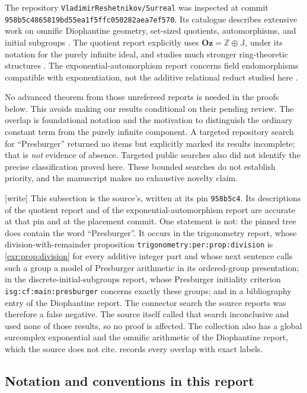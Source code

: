 \documentclass[11pt,letterpaper]{article}
\numberwithin{equation}{section}
\theoremstyle{definition}
\theoremstyle{remark}
\newcommand{\Oz}{\mathbf{Oz}}
\newcommand{\Z}{\mathbb Z}
\newcommand{\J}{\mathbb J}
\newcommand{\repoSHA}{\nolinkurl{958b5c4865819bd55ea1f5ffc050282aea7ef570}}
\newcommand{\lbl}[1]{\nolinkurl{#1}}%
\newcommand{\wtag}{\textup{[write]}}%
\begin{document}
The repository \texttt{VladimirReshetnikov/Surreal} was inspected at commit
\repoSHA. Its catalogue describes extensive work on omnific Diophantine geometry,
set-sized quotients, automorphisms, and initial subgroups \cite{repo-catalogue}.
The quotient report explicitly uses $\Oz=\Z\oplus\J$, under its notation for the
purely infinite ideal, and studies much stronger ring-theoretic structures
\cite{repo-quotients}. The exponential-automorphism report concerns field
endomorphisms compatible with exponentiation, not the additive relational reduct
studied here \cite{repo-exp}.

No advanced theorem from those unrefereed reports is needed in the proofs below.
This avoids making our results conditional on their pending review. The overlap
is foundational notation and the motivation to distinguish the ordinary constant
term from the purely infinite component. A targeted repository search for
``Presburger'' returned no items but explicitly marked its results incomplete;
that is \emph{not} evidence of absence. Targeted public searches also did not
identify the precise classification proved here. These bounded searches do not
establish priority, and the manuscript makes no exhaustive novelty claim.

\wtag{} This subsection is the source's, written at its pin
\nolinkurl{958b5c4}. Its descriptions of the quotient report and of the
exponential-automorphism report are accurate at that pin and at the placement
commit. One statement is not: the pinned tree does contain the word
``Presburger''. It occurs in the trigonometry report, whose
division-with-remainder proposition \lbl{trigonometry:per:prop:division} is
\cref{exr:prop:division} for every additive integer part and whose next
sentence calls such a group a model of Presburger arithmetic in its
ordered-group presentation; in the discrete-initial-subgroups report, whose
Presburger initiality criterion \lbl{isg:cf:main:presburger} concerns exactly
these groups; and in a bibliography entry of the Diophantine report. The
connector search the source reports was therefore a false negative. The
source itself called that search inconclusive and used none of those results,
so no proof is affected. The collection also has a global surcomplex
exponential and the omnific arithmetic of the Diophantine report, which the
source does not cite.  records every overlap with
exact labels.

\subsection{Notation and conventions in this report}\label{exr:sec:conventions}
\end{document}
